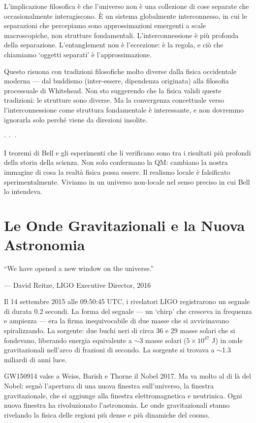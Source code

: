 \documentclass[12pt,a4paper,openany]{book}
\newcommand{\sezione}[1]{\vspace{1.2em}{\large\bfseries #1}\vspace{0.5em}\par}
\newcommand{\puntini}{\begin{center}$\cdot\ \cdot\ \cdot$\end{center}\vspace{0.3em}}
\begin{document}
L'implicazione filosofica è che l'universo non è una collezione di cose separate che occasionalmente interagiscono. È un sistema globalmente interconnesso, in cui le separazioni che percepiamo sono approssimazioni emergenti a scale macroscopiche, non strutture fondamentali. L'interconnessione è più profonda della separazione. L'entanglement non è l'eccezione: è la regola, e ciò che chiamiamo `oggetti separati' è l'approssimazione.

Questo risuona con tradizioni filosofiche molto diverse dalla fisica occidentale moderna --- dal buddismo (inter-essere, dipendenza originata) alla filosofia processuale di Whitehead. Non sto suggerendo che la fisica validi queste tradizioni: le strutture sono diverse. Ma la convergenza concettuale verso l'interconnessione come struttura fondamentale è interessante, e non dovremmo ignorarla solo perché viene da direzioni insolite.

\puntini

I teoremi di Bell e gli esperimenti che li verificano sono tra i risultati più profondi della storia della scienza. Non solo confermano la QM: cambiano la nostra immagine di cosa la realtà fisica possa essere. Il realismo locale è falsificato sperimentalmente. Viviamo in un universo non-locale nel senso preciso in cui Bell lo intendeva.

\chapter{Le Onde Gravitazionali e la Nuova Astronomia}

\epigraph{``We have opened a new window on the universe.''}{--- David Reitze, LIGO Executive Director, 2016}

\sezione{Il 14 settembre 2015}

Il 14 settembre 2015 alle 09:50:45 UTC, i rivelatori LIGO registrarono un segnale di durata 0.2 secondi. La forma del segnale — un `chirp' che cresceva in frequenza e ampiezza — era la firma inequivocabile di due masse che si avvicinavano spiralizzando. La sorgente: due buchi neri di circa 36 e 29 masse solari che si fondevano, liberando energia equivalente a $\sim$3 masse solari ($5 \times 10^{47}$ J) in onde gravitazionali nell'arco di frazioni di secondo. La sorgente si trovava a $\sim$1.3 miliardi di anni luce.

GW150914 valse a Weiss, Barish e Thorne il Nobel 2017. Ma va molto al di là del Nobel: segnò l'apertura di una nuova finestra sull'universo, la finestra gravitazionale, che si aggiunge alla finestra elettromagnetica e neutrinica. Ogni nuova finestra ha rivoluzionato l'astronomia. Le onde gravitazionali stanno rivelando la fisica delle regioni più dense e più dinamiche del cosmo.
\end{document}
